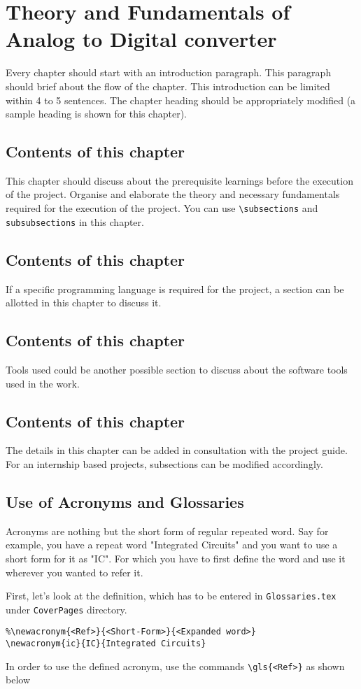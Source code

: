 \chapter{Theory and Fundamentals of Analog to Digital converter}

Every chapter should start with an introduction paragraph. This paragraph should brief about the flow of the chapter. This introduction can be limited within 4 to 5 sentences. The chapter heading should be appropriately modified (a sample heading is shown for this chapter). 
\section{Contents of this chapter}

This chapter should discuss about the prerequisite learnings before the execution of the project. Organise and elaborate the theory and necessary fundamentals required for the execution of the project. You can use \verb|\subsections| and \verb|subsubsections| in this chapter.
\section{Contents of this chapter}
If a specific programming language is required for the project, a section can be allotted in this chapter to discuss it. 
\section{Contents of this chapter}
Tools used could be another possible section to discuss about the software tools used in the work. 
\section{Contents of this chapter}
The details in this chapter can be added in consultation with the project guide. For an internship based projects, subsections can be modified accordingly. 

\section{Use of Acronyms and Glossaries}
Acronyms are nothing but the short form of regular repeated word. Say for example, you have a repeat word "Integrated Circuits" and you want to use a short form for it as "IC". For which you have to first define the word and use it wherever you wanted to refer it.

First, let's look at the definition, which has to be entered in \texttt{Glossaries.tex} under \texttt{CoverPages} directory.
\begin{verbatim}
%\newacronym{<Ref>}{<Short-Form>}{<Expanded word>}
\newacronym{ic}{IC}{Integrated Circuits}
\end{verbatim}
In order to use the defined acronym, use the commands \verb|\gls{<Ref>}| as shown below

